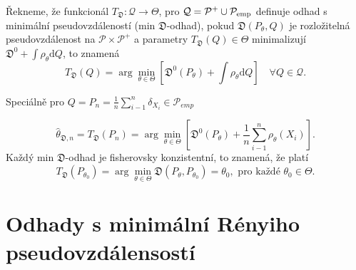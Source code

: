 \begin{definition}
	Řekneme, že funkcionál $T_\mathfrak{D}:\mathcal{Q} \rightarrow \Theta$, pro $\mathcal{Q}=\mathcal{P}^+ \cup \mathcal{P}_\mathrm{emp}$	definuje odhad s minimální pseudovzdáleností (min $\mathfrak{D}$-odhad), pokud  $\mathfrak{D}(P_\theta,Q)$ je rozložitelná pseudovzdálenost na $\mathcal{P}\times\mathcal{P}^+$ a parametry  $T_\mathfrak{D}(Q) \in \Theta$ minimalizují $\mathfrak{D}^0 + \int{\rho_\theta}\mathrm{d}Q$, to znamená
	\begin{equation}
		T_\mathfrak{D}(Q) = \arg\min_{\theta \in \Theta} \left[ \mathfrak{D}^0(P_\theta) + \int{\rho_\theta}\mathrm{d}Q \right] \quad \forall Q \in \mathcal{Q}.
	\end{equation}
\end{definition}
Speciálně pro $Q = P_n = \frac{1}{n}\sum_{i-1}^n \delta_{X_i} \in \mathcal{P}_{emp}$

\begin{equation}
	\hat{\theta}_{\mathfrak{D},n} =T_\mathfrak{D}(P_n)  = \arg\min_{\theta \in \Theta}\left[ \mathfrak{D}^0(P_\theta) + \dfrac{1}{n} \sum_{i-1}^n \rho_\theta (X_i) \right].
\end{equation}
Každý min $\mathfrak{D}$-odhad je fisherovsky konzistentní, to znamená, že platí
\begin{equation}
	T_\mathfrak{D}(P_{\theta_0}) = \arg\min_{\theta \in \Theta} \mathfrak{D}(P_\theta, P_{\theta_0}) = \theta_0,\text{ pro každé }\theta_0 \in \Theta.
\end{equation}

\section{Odhady s minimální Rényiho pseudovzdálensostí}

